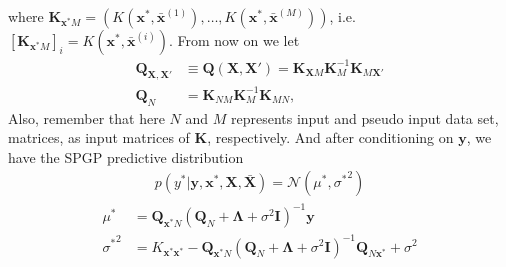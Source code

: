 \documentclass[10pt,a4paper]{article}
\begin{document}
where $\pmb{K}_{\pmb{x}^*M}=(K(\pmb{x}^*,\bar{\pmb{x}}^{(1)}),\dots,K(\pmb{x}^*,\bar{\pmb{x}}^{(M)}))$, i.e. $[\pmb{K}_{\pmb{x}^*M}]_{i}=K(\pmb{x}^*,\bar{\pmb{x}}^{(i)})$. From now on we let 
\begin{align}
\pmb{Q}_{\pmb{X},\pmb{X}'}&\equiv\pmb{Q}(\pmb{X},\pmb{X}')=\pmb{K}_{\pmb{X}M}\pmb{K}_{M}^{-1}\pmb{K}_{M\pmb{X}'}\\
\pmb{Q}_N&=\pmb{K}_{NM}\pmb{K}_{M}^{-1}\pmb{K}_{MN},
\end{align}
Also, remember that here $N$ and $M$ represents input and pseudo input data set, matrices, as input matrices of $\pmb{K}$, respectively.
And after conditioning on $\pmb{y}$, we have the SPGP predictive distribution
\begin{align}
p(y^*|\pmb{y},\pmb{x}^*,\pmb{X},\bar{\pmb{X}})=\mathcal{N}(\mu^*,{\sigma^*}^2)
\end{align}
\begin{equation}
\begin{aligned}
\mu^*&=\pmb{Q}_{\pmb{x}^*N}(\pmb{Q}_N+\pmb{\Lambda}+\sigma^2\pmb{I})^{-1}\pmb{y}\\
{\sigma^*}^2&=K_{\pmb{x}^*\pmb{x}^*}-\pmb{Q}_{\pmb{x}^*N}(\pmb{Q}_N+\pmb{\Lambda}+\sigma^2\pmb{I})^{-1}\pmb{Q}_{N\pmb{x}^*}+\sigma^2
\end{aligned}
\end{equation}
\end{document}
